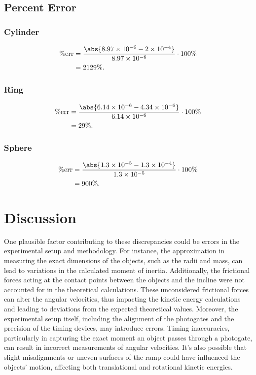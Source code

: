 \documentclass{report}
\begin{document}
    \bigbreak \noindent 
    \subsection{Percent Error}
    \bigbreak \noindent 
    \subsubsection{Cylinder}
    \begin{align*}
        \%\text{err} &= \frac{\abs{8.97 \times 10^{-6 } - 2 \times 10^{-4} }}{8.97 \times 10^{-6}} \cdot 100\% \\
        &=2129\%
    .\end{align*}
    \bigbreak \noindent 
    \subsubsection{Ring}
    \begin{align*}
        \%\text{err} &= \frac{\abs{6.14 \times 10^{-6 } - 4.34 \times 10^{-6} }}{6.14 \times 10^{-6}} \cdot 100\% \\
        &=29\%
    .\end{align*}
    \bigbreak \noindent 
    \subsubsection{Sphere}
    \begin{align*}
        \%\text{err} &= \frac{\abs{1.3 \times 10^{-5 } - 1.3 \times 10^{-4} }}{1.3 \times 10^{-5}} \cdot 100\% \\
        &=900\%
    .\end{align*}




    \bigbreak \noindent 
    \section{Discussion}
    \bigbreak \noindent 
    One plausible factor contributing to these discrepancies could be errors in the experimental setup and methodology. For instance, the approximation in measuring the exact dimensions of the objects, such as the radii and mass, can lead to variations in the calculated moment of inertia. Additionally, the frictional forces acting at the contact points between the objects and the incline were not accounted for in the theoretical calculations. These unconsidered frictional forces can alter the angular velocities, thus impacting the kinetic energy calculations and leading to deviations from the expected theoretical values.
    \bigbreak \noindent 
    Moreover, the experimental setup itself, including the alignment of the photogates and the precision of the timing devices, may introduce errors. Timing inaccuracies, particularly in capturing the exact moment an object passes through a photogate, can result in incorrect measurements of angular velocities. It's also possible that slight misalignments or uneven surfaces of the ramp could have influenced the objects' motion, affecting both translational and rotational kinetic energies.
\end{document}
